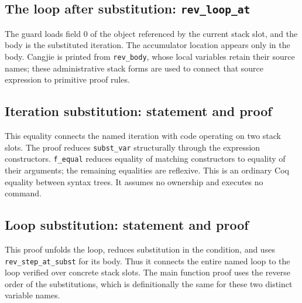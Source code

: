 \documentclass[11pt]{article}
\begin{document}
\subsection{The loop after substitution: \texttt{rev\_loop\_at}}

\begin{minipage}{\linewidth}

\end{minipage}

The guard loads field \(0\) of the object referenced by the current stack
slot, and the body is the substituted iteration. The accumulator location
appears only in the body. Cangjie is printed from \texttt{rev\_body}, whose
local variables retain their source names; these administrative stack forms
are used to connect that source expression to primitive proof rules.

\subsection{Iteration substitution: statement and proof}

\begin{minipage}{\linewidth}

\end{minipage}

This equality connects the named iteration with code operating on two stack
slots. The proof reduces \texttt{subst\_var} structurally through the
expression constructors. \texttt{f\_equal} reduces equality of matching
constructors to equality of their arguments; the remaining equalities are
reflexive. This is an ordinary Coq equality between syntax trees. It assumes
no ownership and executes no command.

\subsection{Loop substitution: statement and proof}

\begin{minipage}{\linewidth}

\end{minipage}

This proof unfolds the loop, reduces substitution in the condition, and uses
\texttt{rev\_step\_at\_subst} for its body. Thus it connects the entire named
loop to the loop verified over concrete stack slots. The main function proof
uses the reverse order of the substitutions, which is definitionally the same
for these two distinct variable names.
\end{document}
